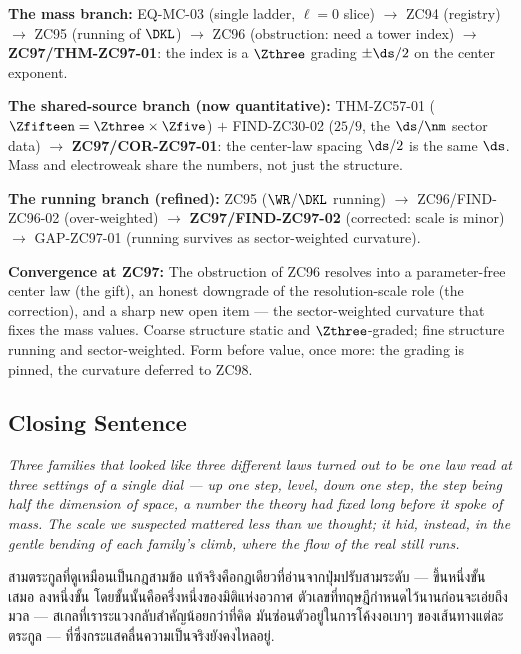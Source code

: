 \documentclass[12pt, a4paper]{article}
\begin{document}
\begin{genealogybox}[title={How ZC97 Sits in the Corpus}]
\textbf{The mass branch:}
EQ-MC-03 (single ladder, $\ell=0$ slice) $\to$ ZC94 (registry) $\to$ ZC95
(running of $\DKL$) $\to$ ZC96 (obstruction: need a tower index) $\to$
\textbf{ZC97/THM-ZC97-01}: the index is a $\Zthree$ grading $\pm\ds/2$ on the
center exponent.

\smallskip
\textbf{The shared-source branch (now quantitative):}
THM-ZC57-01 ($\Zfifteen=\Zthree\times\Zfive$) $+$ FIND-ZC30-02 ($25/9$, the
$\ds/\nm$ sector data) $\to$ \textbf{ZC97/COR-ZC97-01}: the center-law spacing
$\ds/2$ is the same $\ds$. Mass and electroweak share the numbers, not just the
structure.

\smallskip
\textbf{The running branch (refined):}
ZC95 ($\WR$/$\DKL$ running) $\to$ ZC96/FIND-ZC96-02 (over-weighted) $\to$
\textbf{ZC97/FIND-ZC97-02} (corrected: scale is minor) $\to$ GAP-ZC97-01
(running survives as sector-weighted curvature).

\smallskip
\textbf{Convergence at ZC97:}
The obstruction of ZC96 resolves into a parameter-free center law (the gift),
an honest downgrade of the resolution-scale role (the correction), and a sharp
new open item --- the sector-weighted curvature that fixes the mass values.
Coarse structure static and $\Zthree$-graded; fine structure running and
sector-weighted. Form before value, once more: the grading is pinned, the
curvature deferred to ZC98.
\end{genealogybox}

\subsection{Closing Sentence}

\bigskip
\begin{center}
\textit{%
  Three families that looked like three different laws turned out to be one law
  read at three settings of a single dial --- up one step, level, down one step,
  the step being half the dimension of space, a number the theory had fixed long
  before it spoke of mass. The scale we suspected mattered less than we thought;
  it hid, instead, in the gentle bending of each family's climb, where the flow
  of the real still runs.}

\medskip
{\thaifont
สามตระกูลที่ดูเหมือนเป็นกฎสามข้อ แท้จริงคือกฎเดียวที่อ่านจากปุ่มปรับสามระดับ ---
ขึ้นหนึ่งขั้น เสมอ ลงหนึ่งขั้น โดยขั้นนั้นคือครึ่งหนึ่งของมิติแห่งอวกาศ
ตัวเลขที่ทฤษฎีกำหนดไว้นานก่อนจะเอ่ยถึงมวล ---
สเกลที่เราระแวงกลับสำคัญน้อยกว่าที่คิด มันซ่อนตัวอยู่ในการโค้งงอเบาๆ
ของเส้นทางแต่ละตระกูล --- ที่ซึ่งกระแสคลื่นความเป็นจริงยังคงไหลอยู่.}
\end{center}
\end{document}
